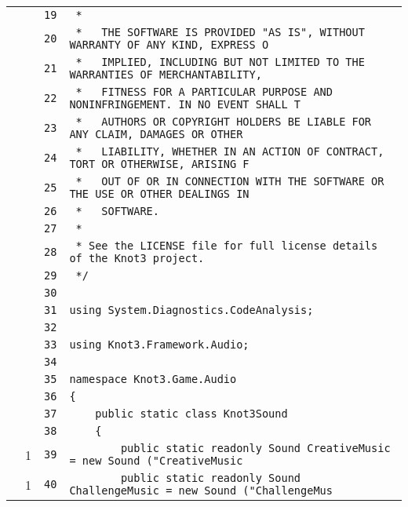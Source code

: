\documentclass[a4paper,10pt]{article}
\begin{document}
\begin{longtable}[l]{lrrl}
\cellcolor{gray} &  & \verb~19~ & \verb~ *~\\
\cellcolor{gray} &  & \verb~20~ & \verb~ *   THE SOFTWARE IS PROVIDED "AS IS", WITHOUT WARRANTY OF ANY KIND, EXPRESS O~\\
\cellcolor{gray} &  & \verb~21~ & \verb~ *   IMPLIED, INCLUDING BUT NOT LIMITED TO THE WARRANTIES OF MERCHANTABILITY,~\\
\cellcolor{gray} &  & \verb~22~ & \verb~ *   FITNESS FOR A PARTICULAR PURPOSE AND NONINFRINGEMENT. IN NO EVENT SHALL T~\\
\cellcolor{gray} &  & \verb~23~ & \verb~ *   AUTHORS OR COPYRIGHT HOLDERS BE LIABLE FOR ANY CLAIM, DAMAGES OR OTHER~\\
\cellcolor{gray} &  & \verb~24~ & \verb~ *   LIABILITY, WHETHER IN AN ACTION OF CONTRACT, TORT OR OTHERWISE, ARISING F~\\
\cellcolor{gray} &  & \verb~25~ & \verb~ *   OUT OF OR IN CONNECTION WITH THE SOFTWARE OR THE USE OR OTHER DEALINGS IN~\\
\cellcolor{gray} &  & \verb~26~ & \verb~ *   SOFTWARE.~\\
\cellcolor{gray} &  & \verb~27~ & \verb~ *~\\
\cellcolor{gray} &  & \verb~28~ & \verb~ * See the LICENSE file for full license details of the Knot3 project.~\\
\cellcolor{gray} &  & \verb~29~ & \verb~ */~\\
\cellcolor{gray} &  & \verb~30~ & \verb~~\\
\cellcolor{gray} &  & \verb~31~ & \verb~using System.Diagnostics.CodeAnalysis;~\\
\cellcolor{gray} &  & \verb~32~ & \verb~~\\
\cellcolor{gray} &  & \verb~33~ & \verb~using Knot3.Framework.Audio;~\\
\cellcolor{gray} &  & \verb~34~ & \verb~~\\
\cellcolor{gray} &  & \verb~35~ & \verb~namespace Knot3.Game.Audio~\\
\cellcolor{gray} &  & \verb~36~ & \verb~{~\\
\cellcolor{gray} &  & \verb~37~ & \verb~    public static class Knot3Sound~\\
\cellcolor{gray} &  & \verb~38~ & \verb~    {~\\
\cellcolor{green} & 1 & \verb~39~ & \verb~        public static readonly Sound CreativeMusic = new Sound ("CreativeMusic~\\
\cellcolor{green} & 1 & \verb~40~ & \verb~        public static readonly Sound ChallengeMusic = new Sound ("ChallengeMus~\\

\end{longtable}
\end{document}
